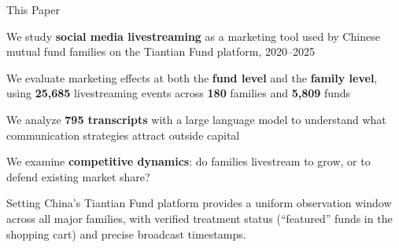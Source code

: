 \documentclass[11pt, aspectratio=169]{beamer}
\newenvironment{wideitemize}{\itemize\addtolength{\itemsep}{6pt}}{\enditemize}
\newcommand{\hl}[1]{\textcolor{myblue}{\textbf{#1}}}
\begin{document}
\begin{frame}{This Paper}

\begin{wideitemize}
  \item We study \hl{social media livestreaming} as a marketing tool used by
  Chinese mutual fund families on the Tiantian Fund platform, 2020--2025

  \item We evaluate marketing effects at both the \textbf{fund level} and the
  \textbf{family level}, using \hl{25,685} livestreaming events across
  \hl{180} families and \hl{5,809} funds

  \item We analyze \hl{795 transcripts} with a large language model to
  understand what communication strategies attract outside capital

  \item We examine \textbf{competitive dynamics}: do families livestream to
  grow, or to defend existing market share?
\end{wideitemize}

\vspace{0.25cm}
\begin{block}{Setting}
  China's Tiantian Fund platform provides a uniform observation window
  across all major families, with verified treatment status (``featured'' funds
  in the shopping cart) and precise broadcast timestamps.
\end{block}

\end{frame}

\end{document}
